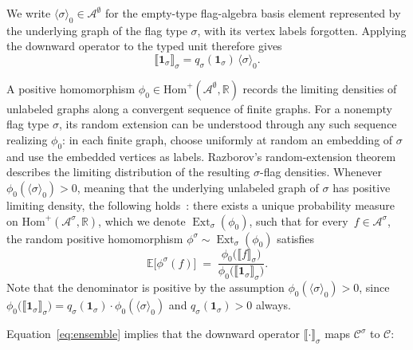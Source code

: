 \documentclass[acmsmall,screen=true,acmthm=false]{acmart}
\newcommand{\poshom}[1]{\mathrm{Hom}^+(\mathcal{A}^{#1}, \mathbb{R})}
\newcommand{\boldparagraph}[1]{\noindentparagraph{\textnormal{\textbf{#1}}}}
\newcommand{\Ext}{\operatorname{Ext}}
\begin{document}
We write $\langle\sigma\rangle_0\in\mathcal{A}^\emptyset$ for the empty-type
flag-algebra basis element represented by the underlying graph of the flag type
$\sigma$, with its vertex labels forgotten.  Applying the downward operator to
the typed unit therefore gives
\[
  \llbracket \mathbf{1}_\sigma \rrbracket_\sigma
  =
  q_\sigma(\mathbf{1}_\sigma)\,\langle\sigma\rangle_0.
\]

\boldparagraph{Random homomorphisms.}
A positive homomorphism $\phi_0 \in \poshom{\emptyset}$ records the limiting
densities of unlabeled graphs along a convergent sequence of finite graphs.
For a nonempty flag type $\sigma$, its random extension can be understood
through any such sequence realizing $\phi_0$: in each finite graph, choose
uniformly at random an embedding of $\sigma$ and use the embedded vertices as
labels.  Razborov's random-extension theorem describes the limiting
distribution of the resulting $\sigma$-flag densities.
Whenever $\phi_0(\langle\sigma\rangle_0) > 0$, meaning that the underlying
unlabeled graph of $\sigma$ has positive limiting density, the following
holds~\cite{razborov2007flag}:
there exists a unique probability measure on $\poshom{\sigma}$,
which we denote $\Ext_\sigma(\phi_0)$,
such that for every~$f \in \mathcal{A}^\sigma$, the random positive
homomorphism $\phi^\sigma \sim \Ext_\sigma(\phi_0)$ satisfies
\begin{equation}\label{eq:ensemble}
  \mathbb{E}\bigl[\phi^\sigma(f)\bigr]
  \;=\;
  \frac{\phi_0\bigl(\llbracket f \rrbracket_\sigma\bigr)}
       {\phi_0\bigl(\llbracket \mathbf{1}_\sigma \rrbracket_\sigma\bigr)}.
\end{equation}
Note that the denominator is positive by the assumption
$\phi_0(\langle\sigma\rangle_0)>0$, since
$\phi_0\bigl(\llbracket \mathbf{1}_\sigma \rrbracket_\sigma\bigr)
=q_\sigma(\mathbf{1}_\sigma)\cdot
\phi_0(\langle\sigma\rangle_0)$ and $q_\sigma(\mathbf{1}_\sigma)>0$ always.

Equation~\eqref{eq:ensemble} implies that the downward operator $\llbracket \cdot \rrbracket_\sigma$ maps $\mathcal{C}^\sigma$ to $\mathcal{C}$:
\end{document}
